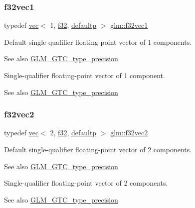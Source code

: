 \subsubsection{\texorpdfstring{f32vec1}{f32vec1}}
{\footnotesize\ttfamily typedef \hyperlink{structglm_1_1vec}{vec}$<$ 1, \hyperlink{group__gtc__type__precision_ga0ec999b57f5330d9021256e96038df04}{f32}, \hyperlink{namespaceglm_a36ed105b07c7746804d7fdc7cc90ff25a9d21ccd8b5a009ec7eb7677befc3bf51}{defaultp} $>$ \hyperlink{group__gtc__type__precision_ga27d40e360fd5b6ad39ca34ded8210b53}{glm\+::f32vec1}}

Default single-\/qualifier floating-\/point vector of 1 components. \begin{DoxySeeAlso}{See also}
\hyperlink{group__gtc__type__precision}{G\+L\+M\+\_\+\+G\+T\+C\+\_\+type\+\_\+precision}
\end{DoxySeeAlso}
Single-\/qualifier floating-\/point vector of 1 component. \begin{DoxySeeAlso}{See also}
\hyperlink{group__gtc__type__precision}{G\+L\+M\+\_\+\+G\+T\+C\+\_\+type\+\_\+precision} 
\end{DoxySeeAlso}
\mbox{\label{group__gtc__type__precision_gaeb896022a9c59e8c3c4ce627c66c9262}} 
\subsubsection{\texorpdfstring{f32vec2}{f32vec2}}
{\footnotesize\ttfamily typedef \hyperlink{structglm_1_1vec}{vec}$<$ 2, \hyperlink{group__gtc__type__precision_ga0ec999b57f5330d9021256e96038df04}{f32}, \hyperlink{namespaceglm_a36ed105b07c7746804d7fdc7cc90ff25a9d21ccd8b5a009ec7eb7677befc3bf51}{defaultp} $>$ \hyperlink{group__gtc__type__precision_gaeb896022a9c59e8c3c4ce627c66c9262}{glm\+::f32vec2}}

Default single-\/qualifier floating-\/point vector of 2 components. \begin{DoxySeeAlso}{See also}
\hyperlink{group__gtc__type__precision}{G\+L\+M\+\_\+\+G\+T\+C\+\_\+type\+\_\+precision}
\end{DoxySeeAlso}
Single-\/qualifier floating-\/point vector of 2 components. \begin{DoxySeeAlso}{See also}
\hyperlink{group__gtc__type__precision}{G\+L\+M\+\_\+\+G\+T\+C\+\_\+type\+\_\+precision} 
\end{DoxySeeAlso}
\mbox{\label{group__gtc__type__precision_ga4d08db2a75d1e8f85e0edbbd76f18ecf}} 
